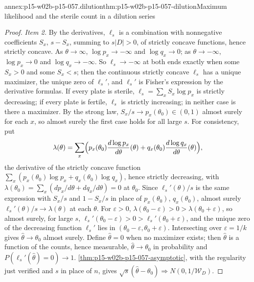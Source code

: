 \begin{annexitem}{annex:p15-w02b-p15-057.dilution}{thm:p15-w02b-p15-057-dilution}{Maximum likelihood and the sterile count in a dilution series}
\begin{proof}
\emph{Item 2.} By the derivatives, \(\ell_s\) is a combination with
nonnegative coefficients \(S_x\), \(s-S_x\), summing to \(s|D|>0\), of
strictly concave functions, hence strictly concave. As
\(\theta\to\infty\), \(\log p_x\to-\infty\) and \(\log q_x\to0\); as
\(\theta\to-\infty\), \(\log p_x\to0\) and \(\log q_x\to-\infty\). So
\(\ell_s\to-\infty\) at both ends exactly when some \(S_x>0\) and some
\(S_x<s\); then the continuous strictly concave \(\ell_s\) has a unique
maximizer, the unique zero of \(\ell_s'\), and \(\ell_s'\) is Fisher's
expression by the derivative formulas. If every plate is sterile,
\(\ell_s=\sum_xS_x\log p_x\) is strictly decreasing; if every plate is
fertile, \(\ell_s\) is strictly increasing; in neither case is there a
maximizer. By the strong law, \(S_x/s\to p_x(\theta_0)\in(0,1)\) almost
surely for each \(x\), so almost surely the first case holds for all large
\(s\). For consistency, put
\[
 \lambda(\theta)=\sum_x\Bigl(p_x(\theta_0)\frac{d\log p_x}{d\theta}(\theta)
 +q_x(\theta_0)\frac{d\log q_x}{d\theta}(\theta)\Bigr),
\]
the derivative of the strictly concave function
\(\sum_x(p_x(\theta_0)\log p_x+q_x(\theta_0)\log q_x)\), hence strictly
decreasing, with \(\lambda(\theta_0)=\sum_x(dp_x/d\theta+dq_x/d\theta)=0\)
at \(\theta_0\). Since \(\ell_s'(\theta)/s\) is the same expression with
\(S_x/s\) and \(1-S_x/s\) in place of \(p_x(\theta_0)\), \(q_x(\theta_0)\),
almost surely \(\ell_s'(\theta)/s\to\lambda(\theta)\) at each \(\theta\).
For \(\varepsilon>0\), \(\lambda(\theta_0-\varepsilon)>0>
\lambda(\theta_0+\varepsilon)\), so almost surely, for large \(s\),
\(\ell_s'(\theta_0-\varepsilon)>0>\ell_s'(\theta_0+\varepsilon)\), and the
unique zero of the decreasing function \(\ell_s'\) lies in
\((\theta_0-\varepsilon,\theta_0+\varepsilon)\). Intersecting over
\(\varepsilon=1/k\) gives \(\widehat\theta\to\theta_0\) almost surely.
Define \(\widehat\theta=0\) when no maximizer exists; then
\(\widehat\theta\) is a function of the counts, hence measurable,
\(\widehat\theta\to\theta_0\) in probability and
\(P(\ell_s'(\widehat\theta)=0)\to1\).
\cref{thm:p15-w02b-p15-057-asymptotic}, with the regularity just verified
and \(s\) in place of \(n\), gives
\(\sqrt s(\widehat\theta-\theta_0)\Rightarrow N(0,1/\mathcal W_D)\).


\end{proof}
\end{annexitem}
